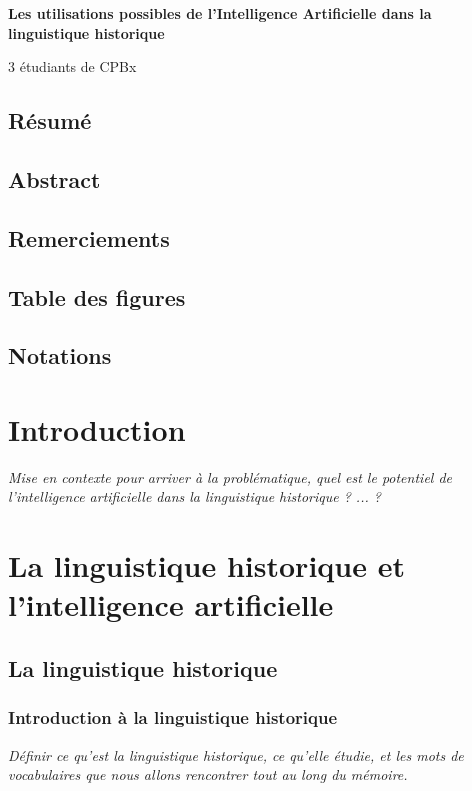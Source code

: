 \documentclass[12pt, letterpaper]{report}
\begin{document}
\begin{titlepage}
    \centering
    \vspace*{\fill}

    \huge\bfseries
    Les utilisations possibles de l'Intelligence Artificielle dans la linguistique historique
    
    \vspace*{1.5cm}
    \large 3 étudiants de CPBx
    
    \vspace*{\fill}
\end{titlepage}

\section{Résumé}
\section{Abstract}
\section{Remerciements}

\tableofcontents
\section{Table des figures}
\section{Notations}

\chapter{Introduction}
\textit{Mise en contexte pour arriver à la problématique, quel est le potentiel de l'intelligence artificielle dans la linguistique historique ? ... ?}

\chapter{La linguistique historique et l'intelligence artificielle}
\section{La linguistique historique}
\subsection{Introduction à la linguistique historique}
\textit{Définir ce qu'est la linguistique historique, ce qu'elle étudie, et les mots de vocabulaires que nous allons rencontrer tout au long du mémoire.}
\end{document}

